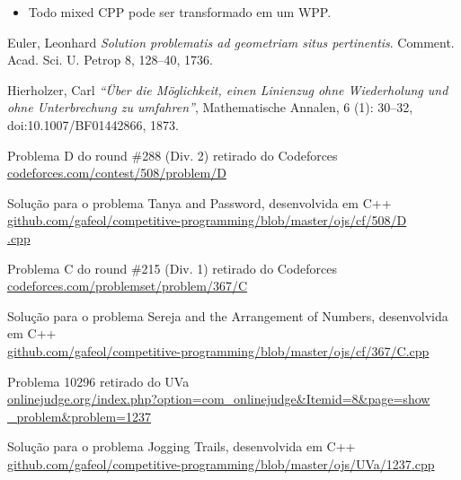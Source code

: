 \documentclass[12pt, a4paper]{article}
\begin{document}
        \begin{itemize}
            \item Todo mixed CPP pode ser transformado em um WPP.
        \end{itemize}

    \fi

	\medskip

	\begin{thebibliography}{9}
	Euler, Leonhard
	\textit{Solution problematis ad geometriam situs pertinentis}. 
	Comment. Acad. Sci. U. Petrop 8, 128–40, 1736.

	Hierholzer, Carl
	\textit{``Über die Möglichkeit, einen Linienzug ohne Wiederholung und ohne Unterbrechung zu umfahren''}, 
	Mathematische Annalen, 6 (1): 30–32, doi:10.1007/BF01442866, 1873.

    Problema D do round \#288 (Div. 2) retirado do Codeforces\\
    \href{https://codeforces.com/contest/508/problem/D}{codeforces.com/contest/508/problem/D}

    Solução para o problema Tanya and Password, desenvolvida em C++\\
    \href{https://github.com/gafeol/competitive-programming/blob/master/ojs/cf/508/D.cpp}{github.com/gafeol/competitive-programming/blob/master/ojs/cf/508/D\\.cpp}

    Problema C do round \#215 (Div. 1) retirado do Codeforces\\
    \href{https://codeforces.com/problemset/problem/367/C}{codeforces.com/problemset/problem/367/C}

    Solução para o problema Sereja and the Arrangement of Numbers, desenvolvida em C++\\
    \href{https://github.com/gafeol/competitive-programming/blob/master/ojs/cf/367/C.cpp}{github.com/gafeol/competitive-programming/blob/master/ojs/cf/367/C.cpp}

    Problema 10296 retirado do UVa\\
    \href{https://onlinejudge.org/index.php?option=com_onlinejudge&Itemid=8&page=show_problem&problem=1237}{onlinejudge.org/index.php?option=com\_onlinejudge\&Itemid=8\&page=show\\\_problem\&problem=1237}

    Solução para o problema Jogging Trails, desenvolvida em C++\\
    \href{https://github.com/gafeol/competitive-programming/blob/master/ojs/UVa/1237.cpp}{github.com/gafeol/competitive-programming/blob/master/ojs/UVa/1237.cpp} 


\end{thebibliography}
\end{document}
